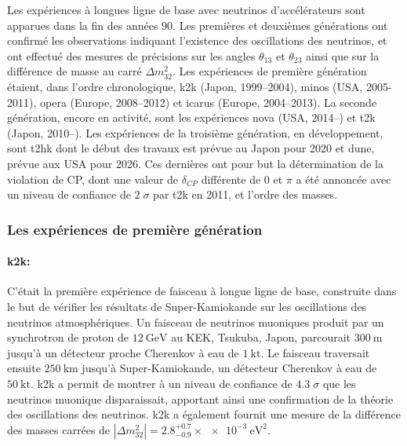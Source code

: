       Les expériences à longues ligne de base avec neutrinos d'accélérateurs sont apparues dans la fin des années 90. Les premières et deuxièmes générations ont confirmé les observations indiquant l'existence des oscillations des neutrinos, et ont effectué des mesures de précisions sur les angles $\theta_{13}$ et $\theta_{23}$ ainsi que sur la différence de masse au carré $\Delta m^2_{32}$\cite{pdg2018}. Les expériences de première génération étaient, dans l'ordre chronologique, \gls{k2k}\cite{Collaboration2006a} (Japon, 1999--2004), \gls{minos}\cite{Collaboration2014} (USA, 2005-2011), \gls{opera}\cite{Agafonova2018} (Europe, 2008--2012) et \gls{icarus} (Europe, 2004--2013). La seconde génération, encore en activité, sont les expériences \gls{nova}\cite{Adamson2016} (USA, 2014--) et \gls{t2k}\cite{Abe2018} (Japon, 2010--). Les expériences de la troisième génération, en développement, sont \gls{t2hk}\cite{HK2018} dont le début des travaux est prévue au Japon pour  2020 et \gls{dune}\cite{Acciarri2016}, prévue aux USA pour 2026. Ces dernières ont pour but la détermination de la violation de CP, dont une valeur de $\delta_{CP}$ différente de $0$ et $\pi$ a été annoncée avec un niveau de confiance de $2\;\sigma$ par \gls{t2k}\cite{Abe2018} en 2011, et l'ordre des masses.

      \subsubsection{Les expériences de première génération}

        \paragraph{\gls{k2k}\cite{Collaboration2006a}:} C'était la première expérience de faisceau à longue ligne de base, construite dans le but de vérifier les résultats de Super-Kamiokande sur les oscillations des neutrinos atmosphériques. Un faisceau de neutrinos muoniques produit par un synchrotron de proton de $\SI{12}{\giga\electronvolt}$ au KEK, Tsukuba, Japon, parcourait $\SI{300}{\meter}$ jusqu'à un détecteur proche Cherenkov à eau de $\SI{1}{\kilo\tonne}$. Le faisceau traversait ensuite $\SI{250}{\kilo\meter}$ jusqu'à Super-Kamiokande, un détecteur Cherenkov à eau de $\SI{50}{\kilo\tonne}$. \gls{k2k} a permit de montrer à un niveau de confiance de $4.3\;\sigma$ que les neutrinos muonique disparaissait, apportant ainsi une confirmation de la théorie des oscillations des neutrinos. \gls{k2k} a également fournit une mesure de la différence des masses carrées de $|\Delta m^2_{32}|=2.8^{+0.7}_{-0.9}\times\SI{e-3}{\electronvolt\squared}$.

